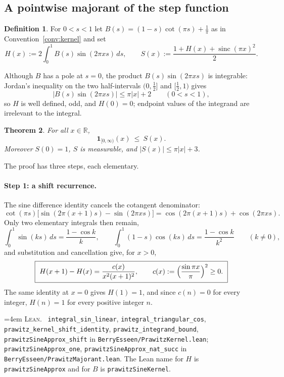 \documentclass[10pt,a4paper]{article}
\theoremstyle{plain}
\newtheorem{theorem}{Theorem}[section]
\theoremstyle{definition}
\newtheorem{definition}[theorem]{Definition}
\newcommand{\R}{\mathbb{R}}
\newcommand{\lean}[1]{\texttt{#1}}
\newcommand{\file}[1]{\texttt{#1}}
\DeclareMathOperator{\sinc}{sinc}
\newenvironment{leanref}%
  {\par\addvspace{3pt}\begingroup\sloppy\emergencystretch=4em
   \noindent\footnotesize\textsc{Lean.}\ \ignorespaces}%
  {\par\endgroup\addvspace{3pt}}
\begin{document}
\subsection{A pointwise majorant of the step function}

\begin{definition}\label{def:H}
For $0<s<1$ let $B(s)=(1-s)\cot(\pi s)+\tfrac1\pi$ as in
Convention~\ref{conv:kernel} and set
\[
  H(x) := 2\int_0^1 B(s)\sin(2\pi xs)\,ds,
  \qquad
  S(x) := \frac{1+H(x)+\sinc(\pi x)^2}{2}.
\]
\end{definition}

Although $B$ has a pole at $s=0$, the product $B(s)\sin(2\pi xs)$ is
integrable: Jordan's inequality on the two half-intervals $(0,\tfrac12]$ and
$[\tfrac12,1)$ gives
\begin{equation}\label{eq:B-bound}
  |B(s)\sin(2\pi xs)| \le \pi|x|+2 \qquad (0<s<1),
\end{equation}
so $H$ is well defined, odd, and $H(0)=0$; endpoint values of the integrand are
irrelevant to the integral.

\begin{theorem}\label{thm:majorant}
For all $x\in\R$,
\[
  \boxed{\ \mathbf 1_{[0,\infty)}(x) \ \le\ S(x).\ }
\]
Moreover $S(0)=1$, $S$ is measurable, and $|S(x)|\le\pi|x|+3$.
\end{theorem}

The proof has three steps, each elementary.

\paragraph{Step 1: a shift recurrence.}
The sine difference identity cancels the cotangent denominator:
\[
  \cot(\pi s)\bigl[\sin(2\pi(x+1)s)-\sin(2\pi xs)\bigr]
  = \cos(2\pi(x+1)s)+\cos(2\pi xs) .
\]
Only two elementary integrals then remain,
\[
  \int_0^1\sin(ks)\,ds = \frac{1-\cos k}{k},
  \qquad
  \int_0^1(1-s)\cos(ks)\,ds = \frac{1-\cos k}{k^2}
  \qquad (k\ne0),
\]
and substitution and cancellation give, for $x>0$,
\begin{equation}\label{eq:shift}
  \boxed{\ H(x+1)-H(x) = \frac{c(x)}{x^2(x+1)^2},
  \qquad c(x) := \Bigl(\frac{\sin\pi x}{\pi}\Bigr)^2 \ge 0.\ }
\end{equation}
The same identity at $x=0$ gives $H(1)=1$, and since $c(n)=0$ for every
integer, $H(n)=1$ for every positive integer $n$.

\begin{leanref}
\lean{integral\_sin\_linear}, \lean{integral\_triangular\_cos},
\lean{prawitz\_kernel\_shift\_identity}, \lean{prawitz\_integrand\_bound},
\lean{prawitzSineApprox\_shift} in \file{BerryEsseen/PrawitzKernel.lean};
\lean{prawitzSineApprox\_one}, \lean{prawitzSineApprox\_nat\_succ} in
\file{BerryEsseen/PrawitzMajorant.lean}. The Lean name for $H$ is
\lean{prawitzSineApprox} and for $B$ is \lean{prawitzSineKernel}.
\end{leanref}
\end{document}
